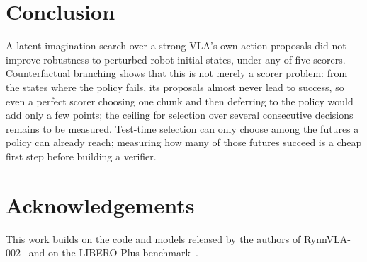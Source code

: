 \documentclass[11pt]{article}
\begin{document}
\section{Conclusion}
A latent imagination search over a strong VLA's own action proposals did not improve robustness to perturbed robot initial states, under any of five scorers. Counterfactual branching shows that this is not merely a scorer problem: from the states where the policy fails, its proposals almost never lead to success, so even a perfect scorer choosing one chunk and then deferring to the policy would add only a few points; the ceiling for selection over several consecutive decisions remains to be measured. Test-time selection can only choose among the futures a policy can already reach; measuring how many of those futures succeed is a cheap first step before building a verifier.

\section*{Acknowledgements}
This work builds on the code and models released by the authors of RynnVLA-002~\citep{cen2025rynnvla002} and on the LIBERO-Plus benchmark~\citep{fei2025liberoplus}.



\end{document}
